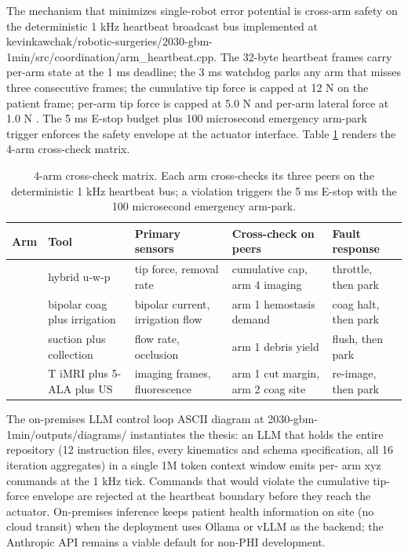 The mechanism that minimizes single-robot error potential is
cross-arm safety on the deterministic 1 kHz heartbeat broadcast bus
implemented at
kevinkawchak/robotic-surgeries/2030-gbm-1min/src/coordination/arm_heartbeat.cpp.
The 32-byte heartbeat frames carry per-arm state at the 1 ms
deadline; the 3 ms watchdog parks any arm that misses three
consecutive frames; the cumulative tip force is capped at 12 N on
the patient frame; per-arm tip force is capped at 5.0 N and per-arm
lateral force at 1.0 N \cite{iec-80601-2-77, iec-62304}. The 5 ms
E-stop budget plus 100 microsecond emergency arm-park trigger
enforces the safety envelope at the actuator interface.
Table \ref{tab:cross-check} renders the 4-arm cross-check matrix.

\begin{table}[H]
\centering
\caption{4-arm cross-check matrix. Each arm cross-checks its three
peers on the deterministic 1 kHz heartbeat bus; a violation triggers
the 5 ms E-stop with the 100 microsecond emergency arm-park.}
\label{tab:cross-check}
\begin{tabular}{>{\raggedright\arraybackslash}p{0.9cm}
                >{\raggedright\arraybackslash}p{2.8cm}
                >{\raggedright\arraybackslash}p{3.4cm}
                >{\raggedright\arraybackslash}p{4cm}
                >{\raggedright\arraybackslash}p{3.2cm}}
\toprule
\textbf{Arm} & \textbf{Tool} & \textbf{Primary sensors} & \textbf{Cross-check on peers} & \textbf{Fault response} \\
\midrule
1 & hybrid u-w-p & tip force, removal rate & cumulative cap, arm 4 imaging & throttle, then park \\
2 & bipolar coag plus irrigation & bipolar current, irrigation flow & arm 1 hemostasis demand & coag halt, then park \\
3 & suction plus collection & flow rate, occlusion & arm 1 debris yield & flush, then park \\
4 & 0.5 T iMRI plus 5-ALA plus US & imaging frames, fluorescence & arm 1 cut margin, arm 2 coag site & re-image, then park \\
\bottomrule
\end{tabular}
\end{table}

The on-premises LLM control loop ASCII diagram at
2030-gbm-1min/outputs/diagrams/ instantiates the thesis: an LLM that
holds the entire repository (12 instruction files, every kinematics
and schema specification, all 16 iteration aggregates) in a single
1M token context window \cite{claude-opus-47, claude-code} emits per-
arm xyz commands at the 1 kHz tick. Commands that would violate the
cumulative tip-force envelope are rejected at the heartbeat boundary
before they reach the actuator. On-premises inference keeps patient
health information on site (no cloud transit) when the deployment
uses Ollama \cite{ollama} or vLLM \cite{vllm} as the backend; the
Anthropic API remains a viable default for non-PHI development.

